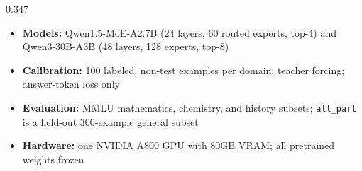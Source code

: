 \documentclass[final]{beamer}
\newcommand{\PosterSans}{\notosans}
\newenvironment{posteritems}{%
  \begin{itemize}\setlength{\itemsep}{2.0mm}\setlength{\parskip}{0pt}\setlength{\parsep}{0pt}%
}{\end{itemize}}
\begin{document}
\begin{frame}[t]
\begin{columns}[T,onlytextwidth]
\begin{column}{0.347\textwidth}
\begin{minipage}[t][88cm][s]{\linewidth}
\begin{CompactBox}[
  title={1. Evaluation setup},
  colframe=PosterCoral,colbacktitle=CoralTint,coltitle=PosterCoral,
  fontupper=\PosterSans\fontsize{21.0}{25.2}\selectfont]
\begin{posteritems}
  \item \textbf{Models:} Qwen1.5-MoE-A2.7B (24 layers, 60 routed experts, top-4) and Qwen3-30B-A3B (48 layers, 128 experts, top-8)
  \item \textbf{Calibration:} 100 labeled, non-test examples per domain; teacher forcing; answer-token loss only
  \item \textbf{Evaluation:} MMLU mathematics, chemistry, and history subsets; \texttt{all\_part} is a held-out 300-example general subset
  \item \textbf{Hardware:} one NVIDIA A800 GPU with 80GB VRAM; all pretrained weights frozen
\end{posteritems}
\end{CompactBox}

\vspace{2.2mm}


\end{minipage}
\end{column}
\end{columns}
\end{frame}
\end{document}

